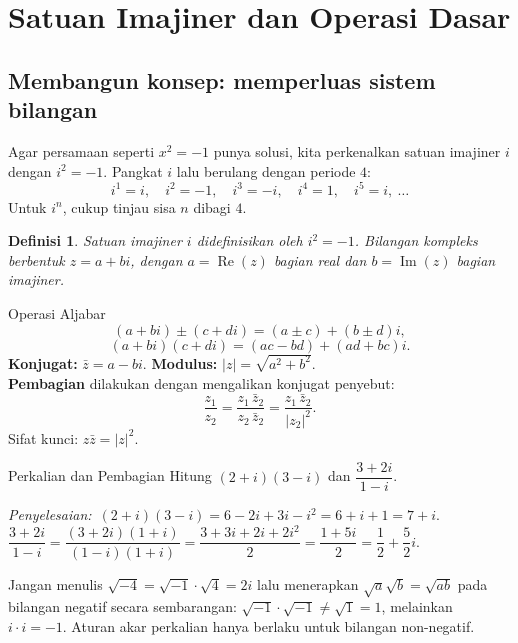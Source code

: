 \documentclass[11pt,a4paper]{report}
\theoremstyle{gaya}
\newtheorem{definisi}{Definisi}[chapter]
\newcommand{\jawab}{\par\smallskip\noindent\textit{\textcolor{oranye}{Penyelesaian:}}\ }
\begin{document}
\section{Satuan Imajiner dan Operasi Dasar}

\subsection*{Membangun konsep: memperluas sistem bilangan}
Agar persamaan seperti $x^2=-1$ punya solusi, kita perkenalkan satuan imajiner $i$ dengan $i^2=-1$. Pangkat $i$ lalu berulang dengan periode $4$:
\[
i^1=i,\quad i^2=-1,\quad i^3=-i,\quad i^4=1,\quad i^5=i,\ \dots
\]
Untuk $i^n$, cukup tinjau sisa $n$ dibagi $4$.

\begin{definisi}
Satuan imajiner $i$ didefinisikan oleh $i^2 = -1$. \emph{Bilangan kompleks} berbentuk
$z = a + bi$, dengan $a=\operatorname{Re}(z)$ bagian real dan $b=\operatorname{Im}(z)$ bagian imajiner.
\end{definisi}

\begin{konsep}{Operasi Aljabar}
\[
(a+bi)\pm(c+di) = (a\pm c)+(b\pm d)i,
\]
\[
(a+bi)(c+di) = (ac-bd)+(ad+bc)i.
\]
\textbf{Konjugat:} $\bar z = a - bi$. \textbf{Modulus:} $|z| = \sqrt{a^2+b^2}$. \\
\textbf{Pembagian} dilakukan dengan mengalikan konjugat penyebut:
\[
\frac{z_1}{z_2}=\frac{z_1\,\bar z_2}{z_2\,\bar z_2}=\frac{z_1\,\bar z_2}{|z_2|^2}.
\]
Sifat kunci: $z\bar z=|z|^2$.
\end{konsep}

\begin{contoh}{Perkalian dan Pembagian}
Hitung $(2+i)(3-i)$ dan $\dfrac{3+2i}{1-i}$.

\jawab $(2+i)(3-i)=6-2i+3i-i^2=6+i+1=7+i$.\\
$\dfrac{3+2i}{1-i}=\dfrac{(3+2i)(1+i)}{(1-i)(1+i)}=\dfrac{3+3i+2i+2i^2}{2}=\dfrac{1+5i}{2}=\dfrac12+\dfrac52 i.$
\end{contoh}

\begin{kesalahan}
Jangan menulis $\sqrt{-4}=\sqrt{-1}\cdot\sqrt{4}=2i$ lalu menerapkan $\sqrt{a}\sqrt{b}=\sqrt{ab}$ pada bilangan negatif secara sembarangan: $\sqrt{-1}\cdot\sqrt{-1}\neq\sqrt{1}=1$, melainkan $i\cdot i=-1$. Aturan akar perkalian hanya berlaku untuk bilangan non-negatif.
\end{kesalahan}
\end{document}
